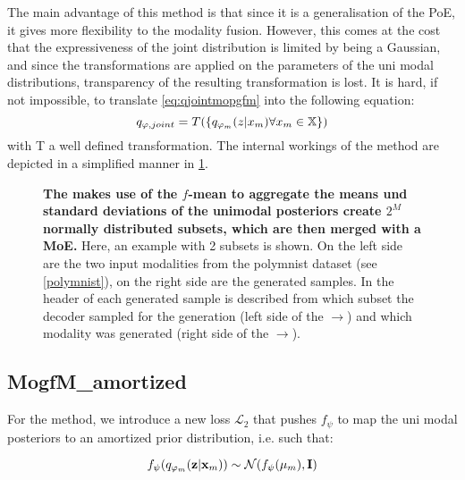The main advantage of this method is that since it is a generalisation of the PoE, it gives more flexibility to the modality fusion.
However, this comes at the cost that the expressiveness of the joint distribution is limited by being a Gaussian, and since the transformations are applied on the parameters of the uni modal distributions, transparency of the resulting transformation is lost.
It is hard, if not impossible, to translate \cref{eq:qjointmopgfm} into the following equation:
\begin{equation}
    q_{\varphi, joint} = T(\{q_{\varphi _m}(z|x_m) \forall x_m \in \mathbb{X}\})
\end{equation}
with T a well defined transformation.
The internal workings of the  method are depicted in a simplified manner in \cref{fig:mopgfm}.


\begin{figure}[h!]
    \centering
    \caption{\textbf{The  makes use of the $f$-mean to aggregate the means und standard deviations of the unimodal posteriors create $2^M$ normally distributed subsets, which are then merged with a MoE.} Here, an example with 2 subsets is shown. On the left side are the two input modalities from the polymnist dataset (see \cref{polymnist}), on the right side are the generated samples. In the header of each generated sample is described from which subset the decoder sampled for the generation (left side of the $\rightarrow$) and which modality was generated (right side of the $\rightarrow$).}
    \label{fig:mopgfm}
\end{figure}



\subsection{MogfM\_amortized}\label{subsubsec:mogfm_amortized}
For the  method, we introduce a new loss $\mathcal{L}_2$ that pushes $f_{\psi}$ to map the uni modal posteriors to an amortized prior distribution, i.e. such that:

\begin{equation}
    \label{eq:amortizedprior}
    f_{\psi}(q_{\varphi_m}(\textbf{z}|\textbf{x}_m)) \sim \mathcal{N}(f_{\psi}(\mu_m), \textbf{I})
\end{equation}

